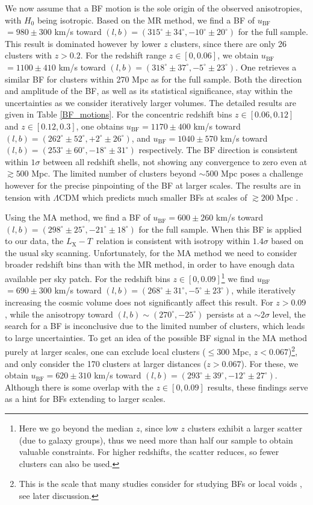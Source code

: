 \documentclass{aa}   %
\newcommand{\LT}{$L_{\text{X}}-T$}
\newcommand{\ubf}{$u_{\text{BF}}$}
\begin{document}
We now assume that a BF motion is the sole origin of the observed anisotropies, with $H_0$ being isotropic. Based on the MR method, we find a BF of \ubf$=980\pm 300$ km/s toward $(l,b)=(315^{\circ}\pm 34^{\circ},-10^{\circ}\pm 20^{\circ})$ for the full sample. This result is dominated however by lower $z$ clusters, since there are only 26 clusters with $z>0.2$. For the redshift range $z\in [0,0.06]$, we obtain \ubf$=1100\pm 410$ km/s toward $(l,b)=(318^{\circ}\pm 37^{\circ} ,-5^{\circ}\pm 23^{\circ})$. One retrieves a similar BF for clusters within 270 Mpc as for the full sample. Both the direction and amplitude of the BF, as well as its statistical significance, stay within the uncertainties as we consider iteratively larger volumes. The detailed results are given in Table \ref{BF_motions}. For the concentric redshift bins $z\in [0.06,0.12]$ and $z\in [0.12,0.3]$, one obtains \ubf$=1170\pm 400$ km/s toward $(l,b)=(262^{\circ}\pm 52^{\circ}, +2^{\circ}\pm 26^{\circ} )$, and \ubf$=1040\pm 570$ km/s toward $(l,b)=(253^{\circ}\pm 60^{\circ}, -18^{\circ}\pm 31^{\circ})$ respectively. The BF direction is consistent within $1\sigma$ between all redshift shells, not showing any convergence to zero even at $\gtrsim 500$ Mpc. The limited number of clusters beyond $\sim 500$ Mpc poses a challenge however for the precise pinpointing of the BF at larger scales. The results are in tension with $\Lambda$CDM which predicts much smaller BFs at scales of $\gtrsim 200$ Mpc \citep[e.g.,][]{li12,carrick,qin}. 

Using the MA method, we find a BF of \ubf$=600\pm 260$ km/s toward $(l,b)=(298^{\circ}\pm 25^{\circ},-21^{\circ}\pm 18^{\circ})$ for the full sample. When this BF is applied to our data, the \LT\ relation is consistent with isotropy within $1.4\sigma$ based on the usual sky scanning. Unfortunately, for the MA method we need to consider broader redshift bins than with the MR method, in order to have enough data available per sky patch. For the redshift bins $z\in [0,0.09]$\footnote{Here we go beyond the median $z$, since low $z$ clusters exhibit a larger scatter (due to galaxy groups), thus we need more than half our sample to obtain valuable constraints. For higher redshifts, the scatter reduces, so fewer clusters can also be used.} we find \ubf$=690\pm 300$ km/s toward $(l,b)=(268^{\circ}\pm 31^{\circ},-5^{\circ}\pm 23^{\circ})$, while iteratively increasing the cosmic volume does not significantly affect this result. For $z>0.09$, while the anisotropy toward $(l,b)\sim (270^{\circ} ,-25^{\circ} )$ persists at a $\sim 2\sigma$ level, the search for a BF is inconclusive due to the limited number of clusters, which leads to large uncertainties. To get an idea of the possible BF signal in the MA method purely at larger scales, one can exclude local clusters ($\leq 300$ Mpc, $z<0.067$)\footnote{This is the scale that many studies consider for studying BFs or local voids \citep[e.g.,][]{jla,carrick}, see later discussion.}, and only consider the 170 clusters at larger distances ($z>0.067$). For these, we obtain  \ubf$=620\pm 310$ km/s toward $(l,b)=(293^{\circ}\pm 39^{\circ},-12^{\circ}\pm 27^{\circ} )$. Although there is some overlap with the $z\in [0,0.09]$ results, these findings serve as a hint for BFs extending to larger scales. 
\end{document}
